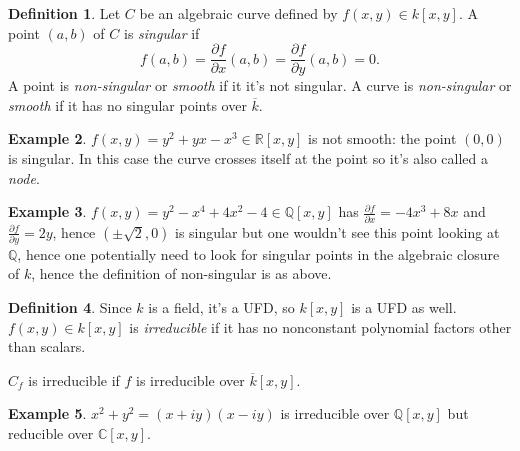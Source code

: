 \documentclass{article}
\newcommand{\Q}{\mathbb{Q}}
\newcommand{\R}{\mathbb{R}}
\newcommand{\C}{\mathbb{C}}
\theoremstyle{definition}
\newtheorem{defn}{Definition}[subsection]
\newtheorem{example}[defn]{Example}
\begin{document}
\begin{defn}
Let $C$ be an algebraic curve defined by $f(x,y)\in k[x,y]$. A point $(a,b)$ of $C$ is \textit{singular} if
\[
f(a,b)=\frac{\partial f}{\partial x}(a,b)=\frac{\partial f}{\partial y}(a,b)=0.
\]
A point is \textit{non-singular} or \textit{smooth} if it it's not singular. A curve is \textit{non-singular} or \textit{smooth} if it has no singular points over $\overline k$.
\end{defn}
\begin{example}
$f(x,y)=y^2+yx-x^3\in\R[x,y]$ is not smooth: the point $(0,0)$ is singular. In this case the curve crosses itself at the point so it's also called a \textit{node}.

\begin{center}
\end{center}
\end{example}

\begin{example}
$f(x,y)=y^2-x^4+4x^2-4\in\Q[x,y]$ has $\frac{\partial f}{\partial x}=-4x^3+8x$ and $\frac{\partial f}{\partial y}=2y$, hence $(\pm\sqrt 2,0)$ is singular but one wouldn't see this point looking at $\Q$, hence one potentially need to look for singular points in the algebraic closure of $k$, hence the definition of non-singular is as above.
\end{example}

\begin{defn}
Since $k$ is a field, it's a UFD, so $k[x,y]$ is a UFD as well. $f(x,y)\in k[x,y]$ is \textit{irreducible} if it has no nonconstant polynomial factors other than scalars.

$C_f$ is irreducible if $f$ is irreducible over $\overline k[x,y]$.
\end{defn}
\begin{example}
$x^2+y^2=(x+iy)(x-iy)$ is irreducible over $\Q[x,y]$ but reducible over $\C[x,y]$.
\end{example}
\end{document}
